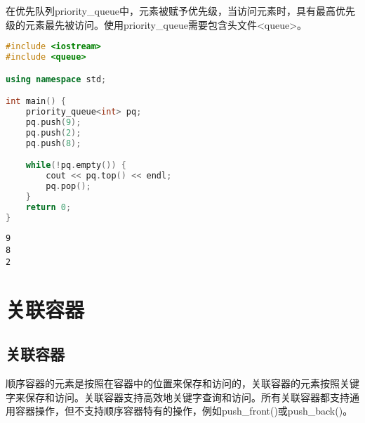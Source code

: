在优先队列priority\_queue中，元素被赋予优先级，当访问元素时，具有最高优先级的元素最先被访问。使用priority\_queue需要包含头文件<queue>。

\begin{table}[H]
	\centering
	\caption{priority\_queue操作}
\end{table}


\begin{lstlisting}[language=C++]
#include <iostream>
#include <queue>

using namespace std;

int main() {
	priority_queue<int> pq;
	pq.push(9);
	pq.push(2);
	pq.push(8);

	while(!pq.empty()) {
		cout << pq.top() << endl;
		pq.pop();
	}
	return 0;
}
\end{lstlisting}

\begin{tcolorbox}
	\begin{verbatim}
9
8
2
	\end{verbatim}
\end{tcolorbox}

\newpage

\section{关联容器}

\subsection{关联容器}

顺序容器的元素是按照在容器中的位置来保存和访问的，关联容器的元素按照关键字来保存和访问。关联容器支持高效地关键字查询和访问。所有关联容器都支持通用容器操作，但不支持顺序容器特有的操作，例如push\_front()或push\_back()。 \\


